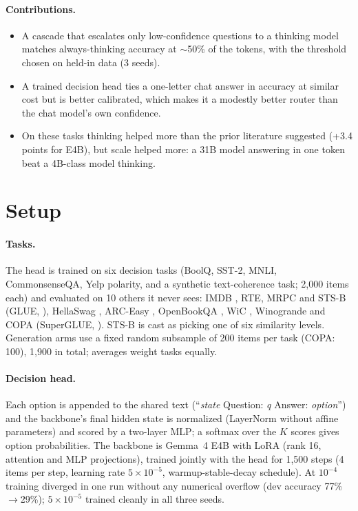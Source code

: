 \documentclass[11pt]{article}
\begin{document}
\paragraph{Contributions.}
\begin{itemize}\setlength\itemsep{0pt}
\item A cascade that escalates only low-confidence questions to a thinking model matches always-thinking
  accuracy at $\sim$50\% of the tokens, with the threshold chosen on held-in data (3 seeds).
\item A trained decision head ties a one-letter chat answer in accuracy at similar cost but is better calibrated,
  which makes it a modestly better router than the chat model's own confidence.
\item On these tasks thinking helped more than the prior literature suggested (+3.4 points for E4B), but scale
  helped more: a 31B model answering in one token beat a 4B-class model thinking.
\end{itemize}

\section{Setup}
\paragraph{Tasks.} The head is trained on six decision tasks (BoolQ, SST-2, MNLI, CommonsenseQA, Yelp polarity,
and a synthetic text-coherence task; 2,000 items each) and evaluated on 10 others it never sees: IMDB
\citep{maas-etal-2011-learning}, RTE, MRPC and STS-B (GLUE, \citealp{wang2019gluemultitaskbenchmarkanalysis}),
HellaSwag \citep{zellers2019hellaswagmachinereallyfinish}, ARC-Easy \citep{clark2018thinksolvedquestionanswering},
OpenBookQA \citep{mihaylov2018suitarmorconductelectricity}, WiC \citep{pilehvar2019wicwordincontextdatasetevaluating},
Winogrande \citep{sakaguchi2019winograndeadversarialwinogradschema} and COPA (SuperGLUE,
\citealp{wang2020supergluestickierbenchmarkgeneralpurpose}). STS-B is cast as picking one of six similarity levels.
Generation arms use a fixed random subsample of 200 items per task (COPA: 100), 1,900 in total; averages weight
tasks equally.

\paragraph{Decision head.} Each option is appended to the shared text (``\emph{state} Question: \emph{q} Answer:
\emph{option}'') and the backbone's final hidden state is normalized (LayerNorm without affine parameters) and
scored by a two-layer MLP; a softmax over the $K$ scores gives option probabilities. The backbone is Gemma~4 E4B
with LoRA \citep{hu2021loralowrankadaptationlarge} (rank 16, attention and MLP projections), trained jointly with
the head for 1,500 steps (4 items per step, learning rate $5\times10^{-5}$, warmup-stable-decay schedule). At
$10^{-4}$ training diverged in one run without any numerical overflow (dev accuracy 77\%$\to$29\%); $5\times10^{-5}$
trained cleanly in all three seeds.
\end{document}

